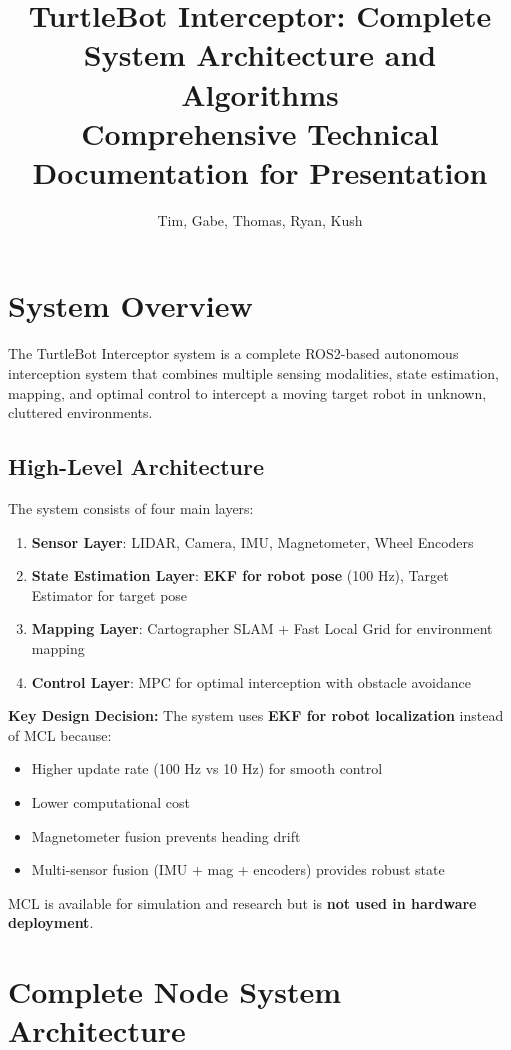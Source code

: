 \documentclass[11pt]{article}
\title{TurtleBot Interceptor: Complete System Architecture and Algorithms\\
\large Comprehensive Technical Documentation for Presentation}
\author{Tim, Gabe, Thomas, Ryan, Kush}
\date{}
\begin{document}
\maketitle

\tableofcontents
\newpage

\section{System Overview}

The TurtleBot Interceptor system is a complete ROS2-based autonomous interception system that combines multiple sensing modalities, state estimation, mapping, and optimal control to intercept a moving target robot in unknown, cluttered environments.

\subsection{High-Level Architecture}

The system consists of four main layers:

\begin{enumerate}
    \item \textbf{Sensor Layer}: LIDAR, Camera, IMU, Magnetometer, Wheel Encoders
    \item \textbf{State Estimation Layer}: \textbf{EKF for robot pose} (100 Hz), Target Estimator for target pose
    \item \textbf{Mapping Layer}: Cartographer SLAM + Fast Local Grid for environment mapping
    \item \textbf{Control Layer}: MPC for optimal interception with obstacle avoidance
\end{enumerate}

\textbf{Key Design Decision:} The system uses \textbf{EKF for robot localization} instead of MCL because:
\begin{itemize}
    \item Higher update rate (100 Hz vs 10 Hz) for smooth control
    \item Lower computational cost
    \item Magnetometer fusion prevents heading drift
    \item Multi-sensor fusion (IMU + mag + encoders) provides robust state
\end{itemize}

MCL is available for simulation and research but is \textbf{not used in hardware deployment}.

\section{Complete Node System Architecture}
\end{document}
